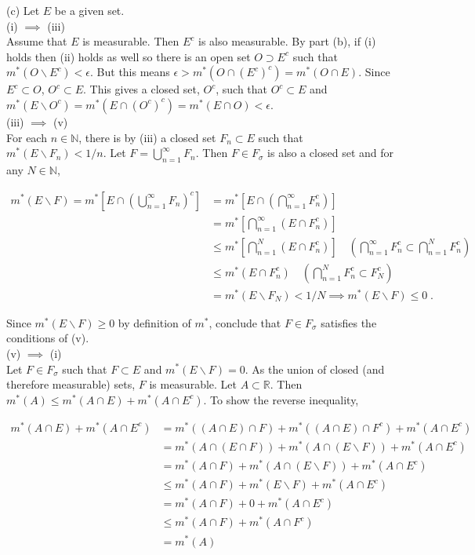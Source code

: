\documentclass[a4paper]{article}
\begin{document}
(c) Let $E$ be a given set.\\

(i) $\implies$ (iii)\\
Assume that $E$ is measurable. Then $E^c$ is also measurable. By part (b), if (i) holds then (ii) holds as well so there is an open set $O \supset E^c$ such that $m^*(O \backslash E^c) < \epsilon$. But this means $\epsilon > m^*(O \cap (E^c)^c) = m^*(O\cap E)$. Since $E^c \subset O$, $O^c \subset E$. This gives a closed set, $O^c$, such that $O^c \subset E$ and $m^*(E \backslash O^c) = m^*(E \cap (O^c)^c) = m^*(E \cap O) < \epsilon$. \\

(iii) $\implies$ (v)\\
For each $n \in \mathbb{N}$, there is by (iii) a closed set $F_n\subset E$ such that $m^*(E \backslash F_n) < 1/n$. Let $F = \bigcup_{n=1}^\infty F_n$. Then $F \in F_\sigma$ is also a closed set and for any $N \in \mathbb{N}$,

\begin{align*}
m^*(E \backslash F) = m^*\left[E \cap \left(\bigcup_{n=1}^\infty F_n\right)^c\right]
&= m^*\left[E \cap \left(\bigcap_{n=1}^\infty F_n^c\right)\right]\\
&= m^*\left[\bigcap_{n=1}^\infty (E\cap F_n^c)\right]\\
&\leq m^*\left[\bigcap_{n=1}^N (E\cap F_n^c)\right]\quad \left(\bigcap_{n=1}^\infty F_n^c\subset \bigcap_{n=1}^N F_n^c\right) \\
&\leq m^*(E\cap F_n^c)\quad \left(\bigcap_{n=1}^N F_n^c\subset F_N^c\right)\\
&= m^*(E \backslash F_N) < 1/N \implies m^*(E \backslash F) \leq 0 \;.
\end{align*}

Since $m^*(E\backslash F) \geq 0$ by definition of $m^*$, conclude that $F \in F_\sigma$ satisfies the conditions of (v). \\

(v) $\implies$ (i)\\
Let $F \in F_\sigma$ such that $F \subset E$ and $m^*(E\backslash F) = 0$. As the union of closed (and therefore measurable) sets, $F$ is measurable. Let $A \subset \mathbb{R}$. Then $m^*(A) \leq m^*(A\cap E) + m^*(A\cap E^c)$. To show the reverse inequality,

\begin{align*}
m^*(A\cap E) + m^*(A\cap E^c) &= m^*((A\cap E)\cap F) + m^*((A\cap E)\cap F^c) + m^*(A\cap E^c)\\
&= m^*(A\cap(E\cap F)) + m^*(A\cap (E \backslash F)) + m^*(A \cap E^c) \\
&= m^*(A\cap F) + m^*(A\cap (E \backslash F)) + m^*(A \cap E^c) \\
&\leq m^*(A\cap F) + m^*(E \backslash F) + m^*(A \cap E^c) \\
&= m^*(A\cap F) +0 + m^*(A \cap E^c) \\
&\leq m^*(A \cap F) + m^*(A \cap F^c)\\
&= m^*(A)
\end{align*}
\end{document}

